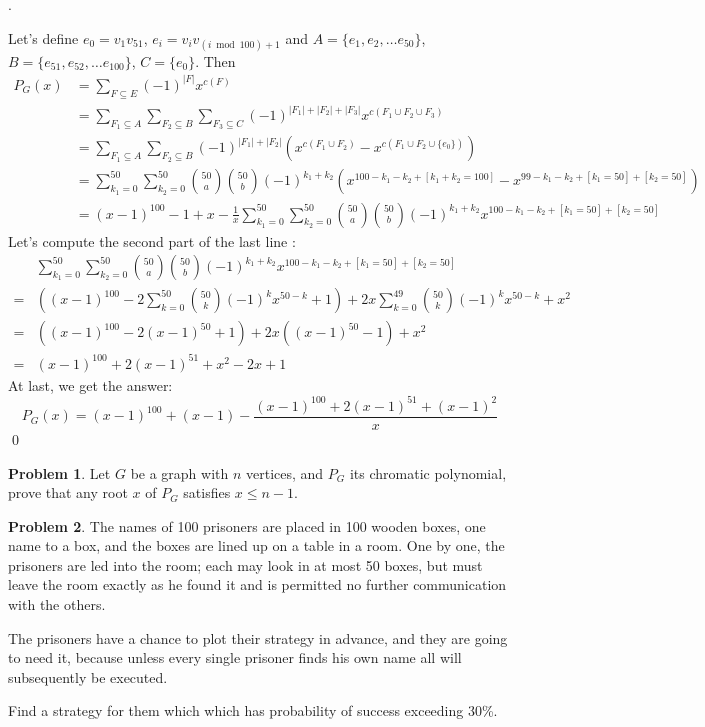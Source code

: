 \documentclass[12pt]{article}
\providecommand{\abs}[1]{\lvert#1\rvert}
\theoremstyle{definition}
\newtheorem{hw}{Problem}
\newenvironment{sol}
  {\par\vspace{3mm}\noindent{\it Solution}.}
  {\qed}
\begin{document}
\begin{sol}
	
	Let's define $e_0 = v_1v_{51}$, $e_i = v_iv_{(i \bmod 100) + 1}$ and $A = \{e_1, e_2, \dots e_{50}\}$, $B = \{e_{51}, e_{52}, \dots e_{100} \}$, $C = \{e_0 \}$. Then 
	\[ 
	\begin{split}
		P_G(x) & = \sum_{F \subseteq E}(-1)^{\abs{F}}x^{c(F)} 	\\
			   & = \sum_{F_1\subseteq A}\sum_{F_2\subseteq B}\sum_{F_3\subseteq C}(-1)^{\abs{F_1}+\abs{F_2}+\abs{F_3}}x^{c(F_1 \cup F_2 \cup F_3)}	\\
			   & = \sum_{F_1\subseteq A}\sum_{F_2\subseteq B}(-1)^{\abs{F_1}+\abs{F_2}}(x^{c(F_1\cup F_2)} - x^{c(F_1\cup F_2 \cup \{e_0\})}) \\
			   & = \sum_{k_1 = 0}^{50}\sum_{k_2 = 0}^{50}\binom{50}{a}\binom{50}{b}(-1)^{k_1+k_2}(x^{100-k_1-k_2+[k_1+k_2=100]} - x^{99-k_1-k_2+[k_1=50]+[k_2=50]})  \\
			   & = (x-1)^{100} - 1 + x - \frac{1}{x}\sum_{k_1 = 0}^{50}\sum_{k_2 = 0}^{50}\binom{50}{a}\binom{50}{b}(-1)^{k_1+k_2}x^{100-k_1-k_2+[k_1=50]+[k_2=50]}
	\end{split}
	\]
	Let's compute the second part of the last line :
	\[
	\begin{split}
		&\sum_{k_1 = 0}^{50}\sum_{k_2 = 0}^{50}\binom{50}{a}\binom{50}{b}(-1)^{k_1+k_2}x^{100-k_1-k_2+[k_1=50]+[k_2=50]} \\
	  = & ((x-1)^{100} - 2\sum_{k=0}^{50}\binom{50}{k}(-1)^kx^{50-k} + 1) + 2x\sum_{k=0}^{49}\binom{50}{k}(-1)^{k}x^{50-k} + x^2 \\
	  = & ((x-1)^{100} - 2(x-1)^{50} + 1)+2x((x-1)^{50}-1)+x^2 \\
	  = & (x-1)^{100}+2(x-1)^{51}+x^2-2x+1
	\end{split}
	\]
	At last, we get the answer:
	$$
		P_G(x) = (x-1)^{100}+(x-1)-\frac{(x-1)^{100}+2(x-1)^{51}+(x-1)^2}{x}
	$$
\end{sol}

\begin{hw}
Let $G$ be a graph with $n$ vertices, and $P_G$ its chromatic
polynomial,
prove that any root $x$ of $P_G$ satisfies $x \leq n-1$.
\end{hw}

\begin{hw} 
The names of 100 prisoners are placed in 100 wooden boxes, one name to a box, and the boxes are
lined up on a table in a room. One by one, the prisoners are led into the room; each may look
in at most 50 boxes, but must leave the room exactly as he found it and is permitted no further
communication with the others.

The prisoners have a chance to plot their strategy in advance, and they are going to need it,
because unless every single prisoner finds his own name all will subsequently be executed.

Find a strategy for them which which has probability of success exceeding 30\%.
\end{hw}
\end{document}
